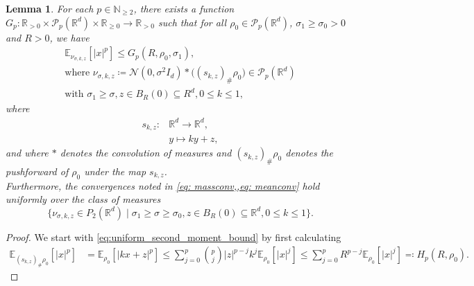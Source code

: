 \documentclass[reqno]{amsart}
\numberwithin{algorithm}{section}
\newcommand{\RR}{\mathbb{R}}
\newcommand{\EE}{{\mathbb E}}
\newcommand{\NN}{{\mathbb N}}
\newcommand{\mc}[1]{\mathcal{#1}}
\newtheorem{lemma}[theorem]{Lemma}
\begin{document}
{\begin{lemma}
        {For each $p \in \NN_{\geq 2}$, there exists a function $G_p\colon \RR_{>0} \times \mathcal{P}_p(\RR^d) \times \RR_{\geq 0} \to \RR_{>0}$ such that for all $\rho_0 \in \mathcal{P}_p(\RR^d)$, $\sigma_1 \geq \sigma_0 > 0$ and $R > 0$, we have
        \begin{equation}\label{eq:uniform_second_moment_bound}
            \begin{gathered}
                \EE_{\nu_{\sigma,k,z}}[|x|^p] \leq G_p(R, \rho_0, \sigma_1), \\
                \text{where } \nu_{\sigma,k,z} \coloneqq \mc{N}(0, \sigma^2 I_d) \ast \Big((s_{k,z})_\# \rho_0\Big) \in \mathcal{P}_p(\RR^d) \\
                \text{with } \sigma_1 \geq \sigma, z \in B_R(0) \subseteq R^d, 0 \leq k \leq 1,
            \end{gathered}
        \end{equation}
        where 
        \begin{equation*}
            \begin{split}
                s_{k, z}\colon & \RR^d \to \RR^d, \\
                & y \mapsto k y + z,
            \end{split}
        \end{equation*}
        and where $\ast$ denotes the convolution of measures and $(s_{k,z})_\# \rho_0$ denotes the pushforward of $\rho_0$ under the map $s_{k,z}$.
        } \\
        Furthermore, the convergences noted in \cref{eq: massconv,,eq: meanconv} hold uniformly over the class of measures
        \begin{equation}\label{eq:nu_uniform_class}
            \Big\{ \nu_{\sigma,k,z} \in P_2(\RR^d) \mid \sigma_1 \geq \sigma \geq \sigma_0, z \in B_R(0) \subseteq \RR^d, 0 \leq k \leq 1\Big\}.
        \end{equation}
    \end{lemma}
    \begin{proof}
        {
        We start with \cref{eq:uniform_second_moment_bound} by first calculating
        \begin{equation*}
            \begin{split}
            \EE_{(s_{k,z})_\# \rho_0}[|x|^p] &= \EE_{\rho_0}[|k x + z|^p] \leq \sum_{j=0}^p \binom{p}{j} |z|^{p-j} k^j \EE_{\rho_0}[|x|^j] \leq \sum_{j=0}^p R^{p-j} \EE_{\rho_0}[|x|^j] \eqqcolon H_p(R, \rho_0).
            \end{split}
        \end{equation*}
}
\end{proof}}
\end{document}
